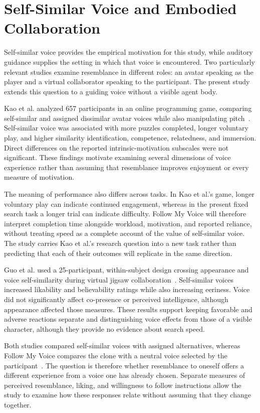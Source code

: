 \section{Self-Similar Voice and Embodied Collaboration}
Self-similar voice provides the empirical motivation for this study, while auditory guidance supplies the setting in which that voice is encountered. Two particularly relevant studies examine resemblance in different roles: an avatar speaking as the player and a virtual collaborator speaking to the participant. The present study extends this question to a guiding voice without a visible agent body.

Kao et al. analyzed 657 participants in an online programming game, comparing self-similar and assigned dissimilar avatar voices while also manipulating pitch~\cite{kao2021selfsimilar}. Self-similar voice was associated with more puzzles completed, longer voluntary play, and higher similarity identification, competence, relatedness, and immersion. Direct differences on the reported intrinsic-motivation subscales were not significant. These findings motivate examining several dimensions of voice experience rather than assuming that resemblance improves enjoyment or every measure of motivation.

The meaning of performance also differs across tasks. In Kao et al.'s game, longer voluntary play can indicate continued engagement, whereas in the present fixed search task a longer trial can indicate difficulty. Follow My Voice will therefore interpret completion time alongside workload, motivation, and reported reliance, without treating speed as a complete account of the value of self-similar voice. The study carries Kao et al.'s research question into a new task rather than predicting that each of their outcomes will replicate in the same direction.

Guo et al. used a 25-participant, within-subject design crossing appearance and voice self-similarity during virtual jigsaw collaboration~\cite{guo2024doppelganger}. Self-similar voices increased likability and believability ratings while also increasing eeriness. Voice did not significantly affect co-presence or perceived intelligence, although appearance affected those measures. These results support keeping favorable and adverse reactions separate and distinguishing voice effects from those of a visible character, although they provide no evidence about search speed.

Both studies compared self-similar voices with assigned alternatives, whereas Follow My Voice compares the clone with a neutral voice selected by the participant~\cite{kao2021selfsimilar,guo2024doppelganger}. The question is therefore whether resemblance to oneself offers a different experience from a voice one has already chosen. Separate measures of perceived resemblance, liking, and willingness to follow instructions allow the study to examine how these responses relate without assuming that they change together.

